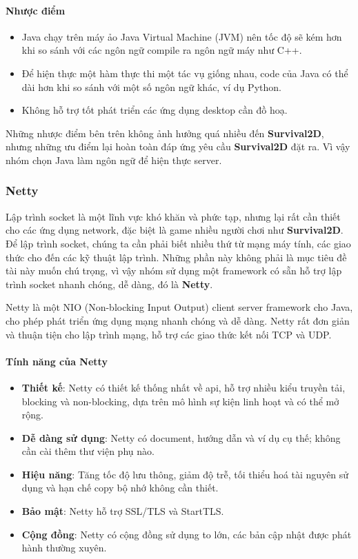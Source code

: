 \documentclass[12pt,a4paper]{article}
\begin{document}
  \paragraph{Nhược điểm}
  \begin{itemize}
      \item Java chạy trên máy ảo Java Virtual Machine (JVM) nên tốc độ sẽ kém hơn khi so sánh với các ngôn ngữ compile ra ngôn ngữ máy như C++.
      \item Để hiện thực một hàm thực thi một tác vụ giống nhau, code của Java có thể dài hơn khi so sánh với một số ngôn ngữ khác, ví dụ Python.
      \item Không hỗ trợ tốt phát triển các ứng dụng desktop cần đồ hoạ.
  \end{itemize}

  Những nhược điểm bên trên không ảnh hưởng quá nhiều đến \textbf{Survival2D}, nhưng những ưu điểm lại hoàn toàn đáp ứng yêu cầu \textbf{Survival2D} đặt ra. Vì vậy nhóm chọn Java làm ngôn ngữ để hiện thực server.

  \subsubsection{Netty}
  Lập trình socket là một lĩnh vực khó khăn và phức tạp, nhưng lại rất cần thiết cho các ứng dụng network, đặc biệt là game nhiều người chơi như \textbf{Survival2D}. Để lập trình socket, chúng ta cần phải biết nhiều thứ từ mạng máy tính, các giao thức cho đến các kỹ thuật lập trình. Những phần này không phải là mục tiêu đề tài này muốn chú trọng, vì vậy nhóm sử dụng một framework có sẵn hỗ trợ lập trình socket nhanh chóng, dễ dàng, đó là \textbf{Netty}.
  
Netty là một NIO (Non-blocking Input Output) client server framework cho Java, cho phép phát triển ứng dụng mạng nhanh chóng và dễ dàng. Netty rất đơn giản và thuận tiện cho lập trình mạng, hỗ trợ các giao thức kết nối TCP và UDP.

  \paragraph{Tính năng của Netty}
  \begin{itemize}
      \item \textbf{Thiết kế}: Netty có thiết kế thống nhất về api, hỗ trợ nhiều kiểu truyền tải, blocking và non-blocking, dựa trên mô hình sự kiện linh hoạt và có thể mở rộng.
      \item \textbf{Dễ dàng sử dụng}: Netty có document, hướng dẫn và ví dụ cụ thế; không cần cài thêm thư viện phụ nào.
      \item \textbf{Hiệu năng}: Tăng tốc độ lưu thông, giảm độ trễ, tối thiểu hoá tài nguyên sử dụng và hạn chế copy bộ nhớ không cần thiết.
      \item \textbf{Bảo mật}: Netty hỗ trợ SSL/TLS và StartTLS.
      \item \textbf{Cộng đồng}: Netty có cộng đồng sử dụng to lớn, các bản cập nhật được phát hành thường xuyên.
  \end{itemize}
\end{document}
